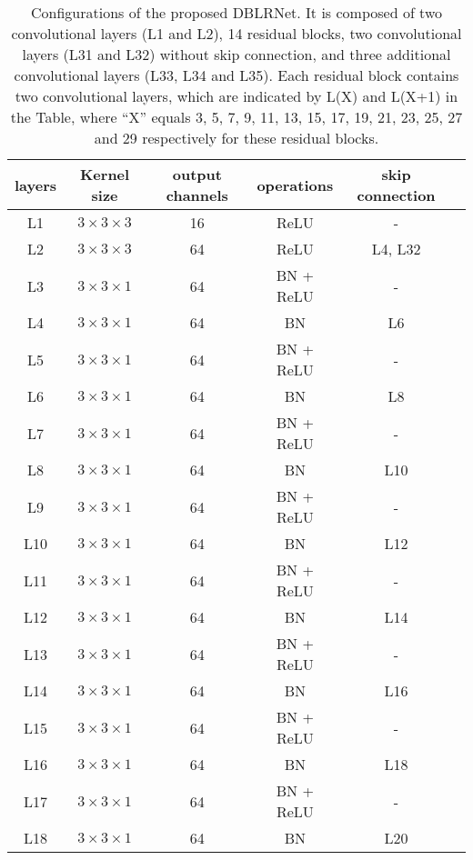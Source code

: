 \documentclass[journal]{IEEEtran}
\begin{document}
\begin{table}
  \centering
  \scriptsize
  \caption{Configurations of the proposed DBLRNet. It is composed of two convolutional layers (L1 and L2), 14 residual blocks, two convolutional layers (L31 and L32)  without skip connection, and three additional convolutional layers (L33, L34 and L35). Each residual block contains two convolutional layers, which are indicated by L(X) and L(X+1) in the Table, where ``X'' equals 3, 5, 7, 9, 11, 13, 15, 17, 19, 21, 23, 25, 27 and 29 respectively for these residual blocks.}
    \begin{tabular}{cccccc}
    \toprule
    layers & Kernel size & output channels & operations & skip connection\\
    \midrule
     L1     & $3 \times 3 \times 3$  & 16 & ReLU & - \\
     L2       & $3 \times 3 \times 3$  & 64 & ReLU & L4, L32 \\
     \midrule
     L3     & $3 \times 3 \times 1$  & 64 & BN + ReLU & - \\
     L4     & $3 \times 3 \times 1$  & 64 & BN        & L6 \\
     L5     & $3 \times 3 \times 1$  & 64 & BN + ReLU & - \\
     L6     & $3 \times 3 \times 1$  & 64 & BN        & L8 \\
     L7     & $3 \times 3 \times 1$  & 64 & BN + ReLU & - \\
     L8     & $3 \times 3 \times 1$  & 64 & BN        & L10 \\
     L9     & $3 \times 3 \times 1$  & 64 & BN + ReLU & - \\
     L10    & $3 \times 3 \times 1$  & 64 & BN        & L12 \\
     L11    & $3 \times 3 \times 1$  & 64 & BN + ReLU & - \\
     L12    & $3 \times 3 \times 1$  & 64 & BN        & L14 \\
     L13    & $3 \times 3 \times 1$  & 64 & BN + ReLU & - \\
     L14    & $3 \times 3 \times 1$  & 64 & BN        & L16 \\
     L15    & $3 \times 3 \times 1$  & 64 & BN + ReLU & - \\
     L16    & $3 \times 3 \times 1$  & 64 & BN        & L18 \\
     L17    & $3 \times 3 \times 1$  & 64 & BN + ReLU & - \\
     L18    & $3 \times 3 \times 1$  & 64 & BN        & L20 \\

\end{tabular}
\end{table}
\end{document}
